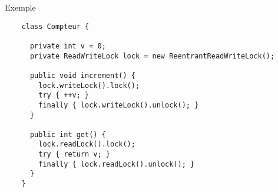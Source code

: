 
\begingroup

\begin{frame}[fragile]{Exemple}

  \begin{lstlisting}
    class Compteur {
      
      private int v = 0;
      private ReadWriteLock lock = new ReentrantReadWriteLock();
      
      public void increment() {
        lock.writeLock().lock();
        try { ++v; }
        finally { lock.writeLock().unlock(); }
      }
      
      public int get() {
        lock.readLock().lock();
        try { return v; }
        finally { lock.readLock().unlock(); }
      }
    }
  \end{lstlisting}

\end{frame}

\endgroup
\endinput
